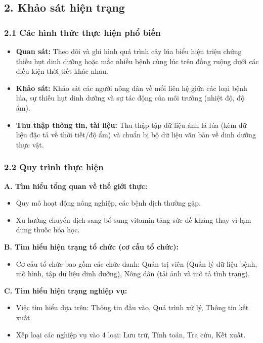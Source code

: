 ﻿\documentclass[12pt,a4paper]{article}
\begin{document}
\hrulefill

\subsection*{2. Khảo sát hiện trạng}
\subsubsection*{2.1 Các hình thức thực hiện phổ biến}
\begin{itemize}
    \item \textbf{Quan sát:} Theo dõi và ghi hình quá trình cây lúa biểu hiện triệu chứng thiếu hụt dinh dưỡng hoặc mắc nhiều bệnh cùng lúc trên đồng ruộng dưới các điều kiện thời tiết khác nhau.
    \item \textbf{Khảo sát:} Khảo sát các người nông dân về mối liên hệ giữa các loại bệnh lúa, sự thiếu hụt dinh dưỡng và sự tác động của môi trường (nhiệt độ, độ ẩm).
    \item \textbf{Thu thập thông tin, tài liệu:} Thu thập tập dữ liệu ảnh lá lúa (kèm dữ liệu đặc tả về thời tiết/độ ẩm) và chuẩn bị bộ dữ liệu văn bản về dinh dưỡng thực vật.
\end{itemize}

\subsubsection*{2.2 Quy trình thực hiện}
\textbf{A. Tìm hiểu tổng quan về thế giới thực:}
\begin{itemize}
    \item Quy mô hoạt động nông nghiệp, các bệnh dịch thường gặp.
    \item Xu hướng chuyển dịch sang bổ sung vitamin tăng sức đề kháng thay vì lạm dụng thuốc hóa học.
\end{itemize}

\textbf{B. Tìm hiểu hiện trạng tổ chức (cơ cấu tổ chức):}
\begin{itemize}
    \item Cơ cấu tổ chức bao gồm các chức danh: Quản trị viên (Quản lý dữ liệu bệnh, mô hình, tập dữ liệu dinh dưỡng), Nông dân (tải ảnh và mô tả tình trạng).
\end{itemize}

\textbf{C. Tìm hiểu hiện trạng nghiệp vụ:}
\begin{itemize}
    \item Việc tìm hiểu dựa trên: Thông tin đầu vào, Quá trình xử lý, Thông tin kết xuất.
    \item Xếp loại các nghiệp vụ vào 4 loại: Lưu trữ, Tính toán, Tra cứu, Kết xuất.
\end{itemize}
\end{document}
